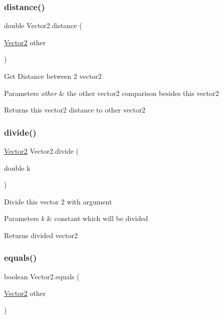 \subsubsection{\texorpdfstring{distance()}{distance()}}
{\footnotesize\ttfamily double Vector2.\+distance (\begin{DoxyParamCaption}\item[{\mbox{\hyperlink{class_vector2}{Vector2}}}]{other }\end{DoxyParamCaption})\hspace{0.3cm}{\ttfamily [inline]}}

Get Distance between 2 vector2 
\begin{DoxyParams}{Parameters}
{\em other} & the other vector2 comparison besides this vector2 \\
\hline
\end{DoxyParams}
\begin{DoxyReturn}{Returns}
this vector2 distance to other vector2 
\end{DoxyReturn}
\mbox{\label{class_vector2_a57eebd54b29694bb748760f658f129fd}} 
\subsubsection{\texorpdfstring{divide()}{divide()}}
{\footnotesize\ttfamily \mbox{\hyperlink{class_vector2}{Vector2}} Vector2.\+divide (\begin{DoxyParamCaption}\item[{double}]{k }\end{DoxyParamCaption})\hspace{0.3cm}{\ttfamily [inline]}}

Divide this vector 2 with argument 
\begin{DoxyParams}{Parameters}
{\em k} & constant which will be divided \\
\hline
\end{DoxyParams}
\begin{DoxyReturn}{Returns}
divided vector2 
\end{DoxyReturn}
\mbox{\label{class_vector2_a2e4b2ed50297b7d7734370395d5f63a5}} 
\subsubsection{\texorpdfstring{equals()}{equals()}}
{\footnotesize\ttfamily boolean Vector2.\+equals (\begin{DoxyParamCaption}\item[{\mbox{\hyperlink{class_vector2}{Vector2}}}]{other }\end{DoxyParamCaption})\hspace{0.3cm}{\ttfamily [inline]}}

